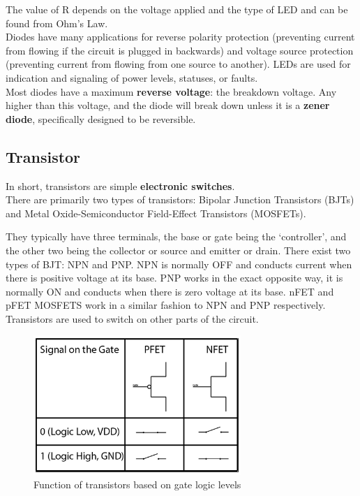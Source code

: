 \documentclass{article}
\begin{document}
The value of R depends on the voltage applied and the type of LED and can be found from Ohm’s Law. \\

Diodes have many applications for reverse polarity protection (preventing current from flowing if the circuit is plugged in backwards) and voltage source protection (preventing current from flowing from one source to another). LEDs are used for indication and signaling of power levels, statuses, or faults. \\

Most diodes have a maximum \textbf{reverse voltage}: the breakdown voltage. Any higher than this voltage, and the diode will break down unless it is a \textbf{zener diode}, specifically designed to be reversible.


\subsection{Transistor}

In short, transistors are simple \textbf{electronic switches}. \\

There are primarily two types of transistors: Bipolar Junction Transistors (BJTs) and Metal Oxide-Semiconductor Field-Effect Transistors (MOSFETs). 

They typically have three terminals, the base or gate being the ‘controller’, and the other two being the collector or source and emitter or drain. There exist two types of BJT: NPN and PNP. NPN is normally OFF and conducts current when there is positive voltage at its base. PNP works in the exact opposite way, it is normally ON and conducts when there is zero voltage at its base. nFET and pFET MOSFETS work in a similar fashion to NPN and PNP respectively. Transistors are used to switch on other parts of the circuit.

\begin{figure} [h]
    \centering
    \includegraphics[width=0.7\textwidth]{img/TransistorSignal.png}
    \caption{Function of transistors based on gate logic levels}
    \label{fig:TranSignal}
\end{figure}
\end{document}
